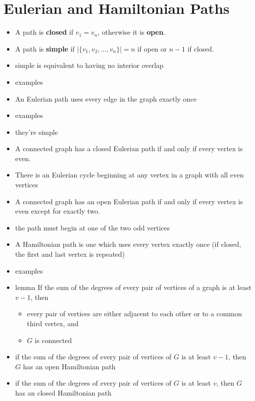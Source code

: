 \section{Eulerian and Hamiltonian Paths}\label{sec:euler}


\begin{itemize}
    \item A path is \textbf{closed} if $v_1 = v_n$, otherwise it is \textbf{open}.
    \item A path is \textbf{simple} if $|\{v_1, v_2, \ldots, v_n\}| = n$ if open or $n-1$ if closed. %
    \item simple is equivalent to having no interior overlap
    \item examples
    \item An Eulerian path uses every edge in the graph exactly once
    \item examples
    \item they're simple
    \item A connected graph has a closed Eulerian path if and only if every vertex is even.
    \item There is an Eulerian cycle beginning at any vertex in a graph with all even vertices
    \item A connected graph has an open Eulerian path if and only if every vertex is even except for exactly two.
    \item the path must begin at one of the two odd vertices
    \item A Hamiltonian path is one which uses every vertex exactly once (if closed, the first and last vertex is repeated)
    \item examples
    \item lemma If the sum of the degrees of every pair of vertices of a graph is at least $v-1$, then
    \begin{itemize}
        \item every pair of vertices are either adjacent to each other or to a common third vertex, and
        \item $G$ is connected
    \end{itemize}
    \item if the sum of the degrees of every pair of vertices of $G$ is at least $v-1$, then $G$ has an open Hamiltonian path
    \item if the sum of the degrees of every pair of vertices of $G$ is at least $v$, then $G$ has an closed Hamiltonian path


\end{itemize}
